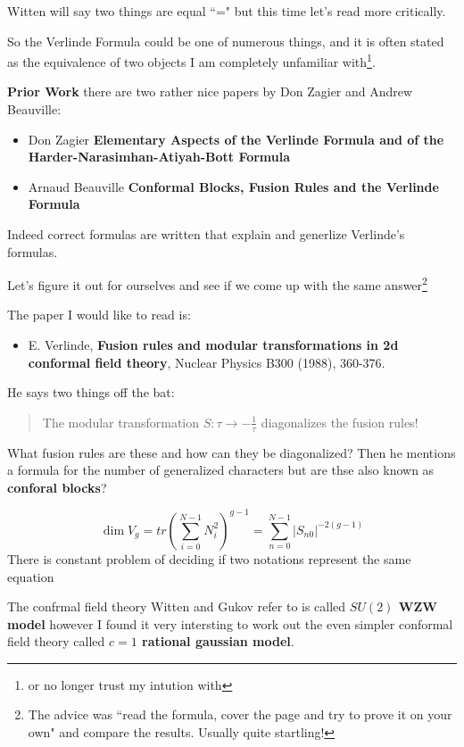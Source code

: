 \documentclass[12pt]{article}
\begin{document}
\noindent Witten will say two things are equal ``=" but this time let's read more critically. \newline

\noindent So the Verlinde Formula could be one of numerous things, and it is often stated as the equivalence of two objects I am completely unfamiliar with\footnote{or no longer trust my intution with}. \newpage

\noindent \textbf{Prior Work} there are two rather nice papers by Don Zagier and 
Andrew Beauville:

\begin{itemize}
\item Don Zagier \textbf{Elementary Aspects of the
Verlinde Formula and of the
Harder-Narasimhan-Atiyah-Bott
Formula}
\item Arnaud Beauville \textbf{Conformal Blocks, Fusion Rules and the Verlinde Formula}
\end{itemize}
Indeed correct formulas are written that explain and generlize Verlinde's formulas.  \newline

\noindent Let's figure it out for ourselves and see if we come up with the same answer\footnote{The advice was ``read the formula, cover the page and try to prove it on your own" and compare the results.  Usually quite startling!}
\newpage

\noindent The paper I would like to read is:
\begin{itemize}
\item  E. Verlinde, \textbf{Fusion rules and modular transformations in 2d conformal field theory},
Nuclear Physics B300 (1988), 360-376.
\end{itemize}

\noindent He says two things off the bat:
\begin{quotation}
\noindent The modular transformation $S: \tau \to - \frac{1}{\tau}$ diagonalizes the fusion rules!
\end{quotation}
What fusion rules are these and how can they be diagonalized?  Then he mentions a formula for the number of {\color{blue} generalized characters} but are thse also known as \textbf{conforal blocks}?

$$ \dim V_g = tr \left( \sum_{i=0}^{N-1} N_i^2 \right)^{g-1} = \sum_{n = 0}^{N-1} |S_{n0}|^{-2(g-1)}$$
There is constant problem of deciding if two notations represent the same equation

\newpage

\noindent The confrmal field theory Witten and Gukov refer to is called \textbf{$SU(2)$ WZW model} however I found it very intersting to work out the even simpler conformal field theory called \textbf{$c=1$ rational gaussian model}. \newline
\end{document}
